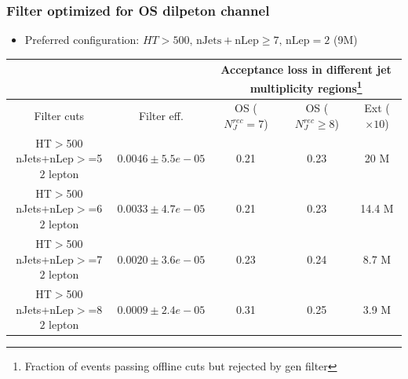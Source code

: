 \documentclass{beamer}
\begin{document}

\begin{frame}
\frametitle{Filter optimized for OS dilpeton channel}
\begin{itemize}
\item{\footnotesize  Preferred configuration: $HT>500,\, \mathrm{nJets+nLep}\geq7,\,  \mathrm{nLep}=2$ (9M)}
\end{itemize}
\begin{center}
{\tiny \begin{tabular}{|c|c|c|c|c|}
            \cline{1-5}
             & & \multicolumn{3}{|c|}{Acceptance loss in different jet multiplicity regions\footnote{Fraction of events passing offline cuts but rejected by gen filter}}\\
            \cline{1-5}
\hline Filter cuts      & Filter eff.   & OS  ($N_J^{rec}=7$)& OS ($N_J^{rec}\geq8$)&  Ext ($\times 10$) \\
\hline \thead{HT$>$500 \\  nJets+nLep$>$=5 \\  $2$ lepton} & $0.0046 \pm 5.5e-05$  & 0.21 & 0.23 & 20 M\\
\hline \thead{HT$>$500 \\  nJets+nLep$>$=6 \\  $2$ lepton} & $0.0033 \pm 4.7e-05$  & 0.21 & 0.23 & 14.4 M\\
\hline \rowcolor{lightgray} \thead{HT$>$500 \\  nJets+nLep$>$=7 \\  $2$ lepton} & $0.0020 \pm 3.6e-05$  & 0.23 & 0.24 & 8.7 M\\
\hline \thead{HT$>$500 \\  nJets+nLep$>$=8 \\  $2$ lepton} & $0.0009 \pm 2.4e-05$  & 0.31 & 0.25 & 3.9 M\\
\hline
\end{tabular} }
\end{center}

\end{frame}

\end{document}
